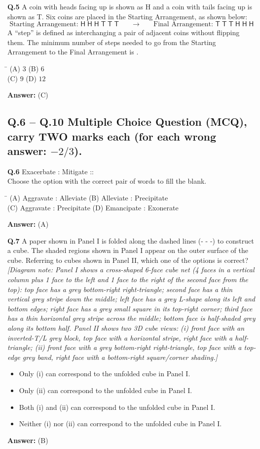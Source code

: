 \documentclass[11pt,a4paper]{article}
\newcommand{\optsfourA}[4]{%
  \begin{tabbing}
    \hspace{0.48\linewidth}\=\kill
    (A) #1 \> (B) #2 \\[2pt]
    (C) #3 \> (D) #4
  \end{tabbing}%
}
\newcommand{\optslistA}[4]{%
  \begin{itemize}
    \setlength{\itemsep}{2pt}\setlength{\parskip}{0pt}
    \item[(A)] #1
    \item[(B)] #2
    \item[(C)] #3
    \item[(D)] #4
  \end{itemize}%
}
\newcommand{\ans}[1]{\textbf{Answer:} #1\par\medskip}
\begin{document}
\textbf{Q.5} A coin with heads facing up is shown as \textsf{H} and a coin with tails facing up is shown as \textsf{T}. Six coins are placed in the Starting Arrangement, as shown below:
\[
  \text{Starting Arrangement: } \textsf{H}\;\textsf{H}\;\textsf{H}\;\textsf{T}\;\textsf{T}\;\textsf{T} \qquad \longrightarrow \qquad \text{Final Arrangement: } \textsf{T}\;\textsf{T}\;\textsf{T}\;\textsf{H}\;\textsf{H}\;\textsf{H}
\]
A ``step'' is defined as interchanging a pair of adjacent coins without flipping them. The minimum number of steps needed to go from the Starting Arrangement to the Final Arrangement is \underline{\hspace{2cm}}.
\optsfourA{$3$}{$6$}{$9$}{$12$}
\ans{(C)}

\subsection*{Q.6 -- Q.10 Multiple Choice Question (MCQ), carry TWO marks each (for each wrong answer: $-2/3$).}

\textbf{Q.6} Exacerbate : Mitigate :: \underline{\hspace{2cm}}\\
Choose the option with the correct pair of words to fill the blank.
\optsfourA{Aggravate : Alleviate}{Alleviate : Precipitate}{Aggravate : Precipitate}{Emancipate : Exonerate}
\ans{(A)}

\textbf{Q.7} A paper shown in Panel I is folded along the dashed lines (- - -) to construct a cube. The shaded regions shown in Panel I appear on the outer surface of the cube. Referring to cubes shown in Panel II, which one of the options is correct?\\[4pt]
\emph{[Diagram note: Panel I shows a cross-shaped 6-face cube net (4 faces in a vertical column plus 1 face to the left and 1 face to the right of the second face from the top): top face has a grey bottom-right right-triangle; second face has a thin vertical grey stripe down the middle; left face has a grey L-shape along its left and bottom edges; right face has a grey small square in its top-right corner; third face has a thin horizontal grey stripe across the middle; bottom face is half-shaded grey along its bottom half. Panel II shows two 3D cube views: (i) front face with an inverted-T/L grey block, top face with a horizontal stripe, right face with a half-triangle; (ii) front face with a grey bottom-right right-triangle, top face with a top-edge grey band, right face with a bottom-right square/corner shading.]}
\optslistA{Only (i) can correspond to the unfolded cube in Panel I.}{Only (ii) can correspond to the unfolded cube in Panel I.}{Both (i) and (ii) can correspond to the unfolded cube in Panel I.}{Neither (i) nor (ii) can correspond to the unfolded cube in Panel I.}
\ans{(B)}
\end{document}
